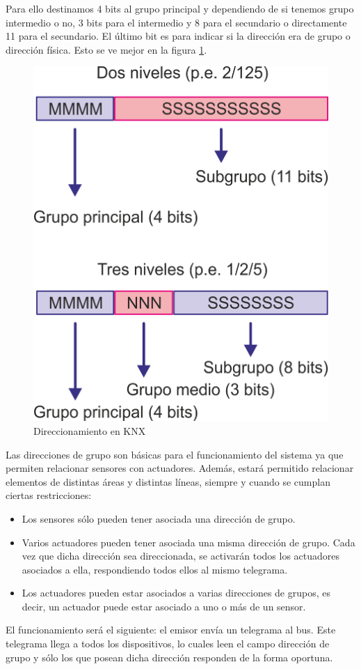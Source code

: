 Para ello destinamos 4 bits al grupo principal y dependiendo de si tenemos grupo intermedio o no, 3 bits para el intermedio y 8 para el secundario o directamente 11 para el secundario. El último bit es para indicar si la dirección era de grupo o dirección física. Esto se ve mejor en la figura \ref{fig:Niveles-direccionamiento-grupo-knx}.
\begin{figure}[htbp]
	\centering
		\includegraphics[height=0.70\textwidth]{imagenes/Niveles-direccionamiento-grupo-knx.png}
	\caption{Direccionamiento en KNX}
	\label{fig:Niveles-direccionamiento-grupo-knx}
\end{figure}



Las direcciones de grupo son básicas para el funcionamiento del sistema ya que permiten relacionar sensores con actuadores. Además, estará permitido relacionar elementos de distintas áreas y distintas líneas, siempre y cuando se cumplan ciertas restricciones:
\begin{itemize}
	\item Los sensores sólo pueden tener asociada una dirección de grupo.
	\item Varios actuadores pueden tener asociada una misma dirección de grupo. Cada vez que dicha dirección sea direccionada, se activarán todos los actuadores asociados a ella, respondiendo todos ellos al mismo telegrama.
	\item Los actuadores pueden estar asociados a varias direcciones de grupos, es decir, un actuador puede estar asociado a uno o más de un sensor.
\end{itemize}


El funcionamiento será el siguiente: el emisor envía un telegrama al bus. Este telegrama llega a todos los dispositivos, lo cuales leen el campo dirección de grupo y sólo los que posean dicha dirección responden de la forma oportuna.


